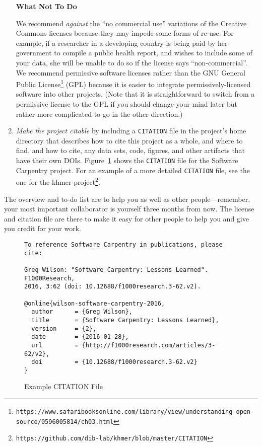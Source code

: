 \documentclass[10pt]{article}
\newcommand{\recommend}[1]{\textit{#1}}
\newcommand{\withurl}[2]{{#1}\footnote{\texttt{#2}}}
\begin{document}
\begin{enumerate}
  \begin{framed}
    \noindent \textbf{What Not To Do}

    We recommend \emph{against} the ``no commercial use'' variations of
    the Creative Commons licenses because they may impede some forms of
    re-use.  For example, if a researcher in a developing country is being
    paid by her government to compile a public health report, and wishes
    to include some of your data, she will be unable to do so if the
    license says ``non-commercial''. We recommend permissive software
    licenses rather than the \withurl{GNU General Public
      License}{https://www.safaribooksonline.com/library/view/understanding-open-source/0596005814/ch03.html}
    (GPL) because it is easier to integrate permissively-licensed software
    into other projects. (Note that it is straightforward to switch from a
    permissive license to the GPL if you should change your mind later but
    rather more complicated to go in the other direction.)
  \end{framed}

\item    
  \recommend{Make the project citable} by including a
  \texttt{CITATION} file in the project's home directory that
  describes how to cite this project as a whole, and where to find,
  and how to cite, any data sets, code, figures, and other artifacts
  that have their own DOIs.  Figure~\ref{fig:citation} shows the
  \texttt{CITATION} file for the Software Carpentry project.
  For an example of a more detailed \texttt{CITATION} file, see the one
  for the \withurl{khmer project}{https://github.com/dib-lab/khmer/blob/master/CITATION}.

\end{enumerate}

The overview and to-do list are to help you as well as other
people---remember, your most important collaborator is yourself three
months from now. The license and citation file are there to make it
easy for other people to help you and give you credit for your work.

\begin{figure}
\begin{verbatim}
To reference Software Carpentry in publications, please cite:

Greg Wilson: "Software Carpentry: Lessons Learned". F1000Research,
2016, 3:62 (doi: 10.12688/f1000research.3-62.v2).

@online{wilson-software-carpentry-2016,
  author      = {Greg Wilson},
  title       = {Software Carpentry: Lessons Learned},
  version     = {2},
  date        = {2016-01-28},
  url         = {http://f1000research.com/articles/3-62/v2},
  doi         = {10.12688/f1000research.3-62.v2}
}
\end{verbatim}
\caption{Example CITATION File}
\label{fig:citation}
\end{figure}
\end{document}
